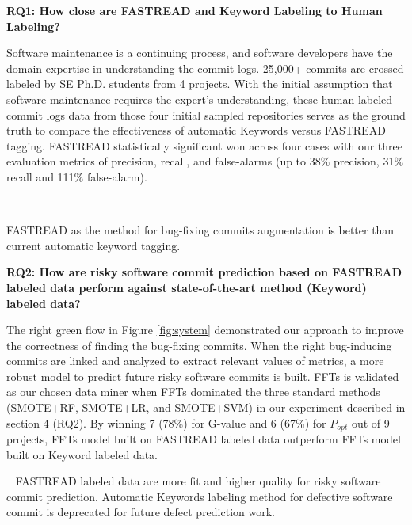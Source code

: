 \documentclass[sigconf,review, anonymous]{acmart}
\newenvironment{RQ}[1]%
{\noindent\begin{minipage}[c]{\linewidth}%
\begin{bclogo}[couleur=gray!25,%
                arrondi=0.1,%
                logo=\bctrombone,%
                ombre=true]{~#1}}%
{\end{bclogo}\end{minipage}\vspace{2mm}}
\begin{document}
\textbf{RQ1: { How close are FASTREAD and Keyword Labeling to Human Labeling?}}
 
Software maintenance is a continuing process, and software developers have the domain expertise in understanding the commit logs. 25,000+ commits are crossed labeled by SE Ph.D. students from 4 projects. With the initial assumption that software maintenance requires the expert's understanding, these human-labeled commit logs data from those four initial sampled repositories serves as the ground truth to compare the effectiveness of automatic Keywords versus FASTREAD tagging. FASTREAD statistically significant won across four cases with our three evaluation metrics of precision, recall, and false-alarms (up to 38\% precision, 31\% recall and 111\% false-alarm).
 

\begin{RQ}{}
\vspace{-10pt}

FASTREAD as the method for bug-fixing commits augmentation is better than current automatic keyword tagging.
\end{RQ}
 
 
 \textbf{RQ2: { How are risky software commit prediction based on FASTREAD labeled data perform against state-of-the-art method (Keyword) labeled data?}}
  

The right green flow in Figure \ref{fig:system} demonstrated our approach to improve the correctness of finding the bug-fixing commits. When the right bug-inducing commits are linked and analyzed to extract relevant values of metrics, a more robust model to predict future risky software commits is built. FFTs is validated as our chosen data miner when FFTs dominated the three standard methods (SMOTE+RF, SMOTE+LR, and SMOTE+SVM) in our experiment described in section 4 (RQ2). By winning 7 (78\%) for G-value and 6 (67\%) for $P_{opt}$ out of 9 projects, FFTs model built on FASTREAD labeled data outperform FFTs model built on Keyword labeled data. 
 

\begin{RQ}{}
\vspace{-10pt}
FASTREAD labeled data are more fit and higher quality for risky software commit prediction. Automatic Keywords labeling method for defective software commit is deprecated for future defect prediction work.  
\end{RQ}
  
\end{document}
